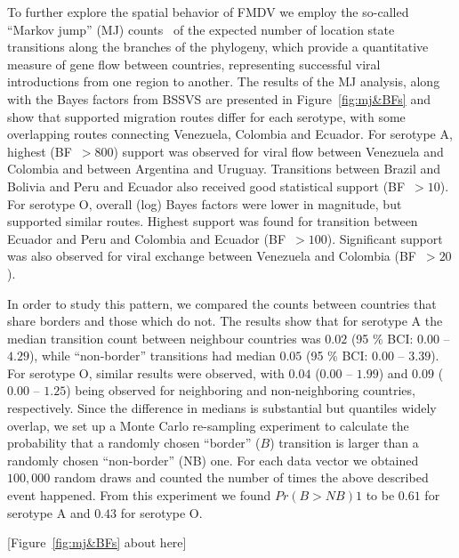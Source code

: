 \documentclass[10pt]{article}
\begin{document}
To further explore the spatial behavior of FMDV we employ the so-called ``Markov jump'' (MJ) counts~\cite{Minin2008} of the expected number of location state transitions along the  branches of the phylogeny, which  provide a quantitative measure of gene flow between countries, representing successful viral introductions from one region to another.
The results of the MJ analysis, along with the Bayes factors from BSSVS are presented in Figure~\ref{fig:mj&BFs} and show that supported migration routes differ for each serotype, with some overlapping routes connecting Venezuela, Colombia and Ecuador.
For serotype A, highest (BF~$>800$) support was observed for viral flow between Venezuela and Colombia and between Argentina and Uruguay.
Transitions between Brazil and Bolivia and Peru and Ecuador also received good statistical support (BF~$>10$).
For serotype O, overall (log) Bayes factors were lower in magnitude, but supported similar routes.
Highest support was found for transition between Ecuador and Peru and Colombia and Ecuador (BF~$>100$). Significant support was also observed for viral exchange between Venezuela and Colombia (BF~$>20$). 


In order to study this pattern, we compared the counts between countries that share borders and those which do not.
The results show that for serotype A the median transition count between neighbour countries was $0.02$ (95 \% BCI: $0.00$ -- $4.29$), while ``non-border'' transitions had median $0.05$ (95 \% BCI: $0.00$ --  $3.39$).
For serotype O, similar results were observed, with $0.04$ ($0.00$ -- $1.99$) and $0.09$ ($0.00$ -- $1.25$) being observed for neighboring and non-neighboring countries, respectively.
Since the difference in medians is substantial but quantiles widely overlap, we set up a Monte Carlo re-sampling experiment to calculate the probability that a randomly chosen ``border'' ($B$) transition is larger than a randomly chosen ``non-border'' (NB) one. For each data vector we obtained $100,000$ random draws and counted the number of times the above described event happened. From this experiment we found $Pr(B>NB)1$  to be $0.61$ for serotype A and $0.43$ for serotype O.

\begin{center}
 [Figure~\ref{fig:mj&BFs} about here]
\end{center}
\end{document}
